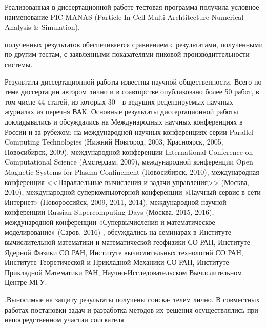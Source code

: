 Реализованная в диссертационной работе тестовая программа получила условное наименование 
PIC-MANAS (Particle-In-Cell Multi-Archtitecture Numerical Analysis & Simulation).


{\reliability}  полученных результатов обеспечивается сравнением с результатами, полученными по другим тестам, с заявленными показателями пиковой производиттельности системы.


{\probation}

Результаты диссертационной работы известны научной общественности. Всего по теме диссертации автором лично и в соавторстве опубликовано более 50 работ, в том числе 44 статей, из которых 30 - в ведущих рецензируемых научных журналах из перечня ВАК. Основные результаты диссертационной работы докладывались и обсуждались на Международных научных конференциях в России и за рубежом: на международной научных конференциях серии Parallel Computing Technologies (Нижний Новгород, 2003, Красноярск, 2005, Новосибирск, 2009), международной конференции International Conference on Computational Science (Амстердам, 2009),  международной конференции Open Magnetic Systems for Plasma Confinement (Новосибирск, 2010), международная конференция <<Параллельные вычисления и задачи управления>> (Москва, 2010), международной суперкомпьютерной конференции  «Научный сервис в сети Интернет» (Новороссийск, 2009, 2011, 2014), международной научной конференции Russian Supercomputing Days (Москва, 2015, 2016), международной конференции «Супервычисления и математическое моделирование» (Саров, 2016) , обсуждались на семинарах в Институте вычислительной математики и математической геофизики СО РАН, Институте Ядерной Физики СО РАН, Институте вычислительных технологий СО РАН, Институте Теоретической и Прикладной Механики СО РАН, Институте Прикладной Математики РАН, Научно-Исследовательском Вычислительном Центре МГУ.



{\contribution} .Выносимые на защиту результаты получены соиска-
телем лично. В совместных работах постановки задач и разработка методов их решения осуществлялись при непосредственном участии соискателя.



